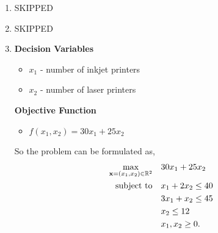 \begin{enumerate}
\begin{enumerate}[label=(\alph*)]
\begin{enumerate}
                        \item If \(x_3 = x_4 = 0\), then \(x_2 =2, x_1 = -1\) which is not in the feasible region.
                    \end{enumerate}
                    Thus extreme points for \(\Omega_3\) are \(\fx = \begin{pmatrix}
                        0 & 0 & 1 & 2
                    \end{pmatrix}, \begin{pmatrix}
                        0 & 1 & 0 & 1
                    \end{pmatrix}, \begin{pmatrix}
                        1 & 0 & 0 & 2
                    \end{pmatrix}\).
          \end{enumerate}
    \item {\color{red} SKIPPED}
    \item {\color{red} SKIPPED}
    \item           \begin{minipage}[t]{0.45\textwidth}
              \textbf{Decision Variables}
              \begin{itemize}
                  \item \(x_1\) - number of inkjet printers
                  \item \(x_2\) - number of laser printers
              \end{itemize}
              \textbf{Objective Function}
              \begin{itemize}
                  \item \(f(x_1, x_2) = 30x_1 + 25x_2\)
              \end{itemize}
              So the problem can be formulated as,
              \begin{align*}
                  \max_{\mathbf{x} = (x_1, x_2) \in \mathbb{R}^2} \quad & 30x_1 + 25x_2      \\
                  \text{subject to}\quad                  & x_1 + 2x_2 \leq 40 \\
                                                          & 3x_1 + x_2 \leq 45 \\
                                                          & x_2 \leq 12        \\
                                                          & x_1, x_2 \geq 0.
              \end{align*}
          \end{minipage}

\end{enumerate}
